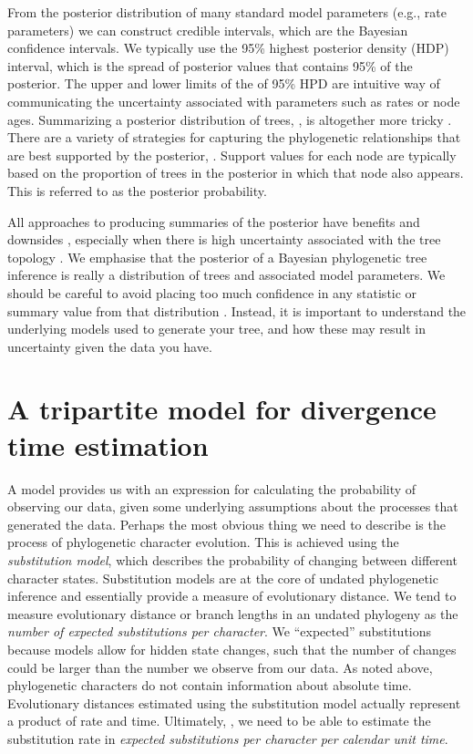 From the posterior distribution of many standard model parameters (e.g., rate parameters) we can construct credible intervals, which are the Bayesian  confidence intervals.
We typically use the 95\% highest posterior density (HDP) interval, which is the spread of posterior values that contains 95\% of the posterior.
The upper and lower limits of the of 95\% HPD are  intuitive way of communicating the uncertainty associated with parameters such as rates or node ages.
Summarizing a posterior distribution of trees, , is altogether more tricky \citep{heled2013,OReilly2018}.
There are a variety of strategies for capturing the phylogenetic relationships that are best supported by the posterior, .
Support values for each node are typically based on the proportion of trees in the posterior in which that node also appears.
This is referred to as the posterior probability.

All approaches to producing summaries of the posterior have benefits and downsides \citep{heled2013}, especially when there is high uncertainty associated with the tree topology \citep{OReilly2018}.
We emphasise that the posterior of a Bayesian phylogenetic tree inference is really a distribution of trees and associated model parameters.
We should be careful to avoid placing too much confidence in any statistic or summary value from that distribution \citep{Warnock2017}.
Instead, it is important to understand the underlying models used to generate your tree, and how these may result in uncertainty given the data you have.

\section{A tripartite model for divergence time estimation}

A model provides us with an expression for calculating the probability of observing our data, given some underlying assumptions about the processes that generated the data.
Perhaps the most obvious thing we need to describe is the process of phylogenetic character evolution.
This is achieved  using the \textit{substitution model}, which describes the probability of changing between different character states.
Substitution models are at the core of undated phylogenetic inference and essentially provide a measure of evolutionary distance.
We tend to measure evolutionary distance or branch lengths in an undated phylogeny as the \textit{number of expected substitutions per character}. We  ``expected'' substitutions because models allow for hidden state changes, such that the number of changes could be larger than the number we observe from our data.
As noted above, phylogenetic characters do not contain information about absolute time. Evolutionary distances estimated using the substitution model actually represent a product of rate and time.
Ultimately, , we need to be able to estimate the substitution rate in \textit{expected substitutions per character per calendar unit time}.

